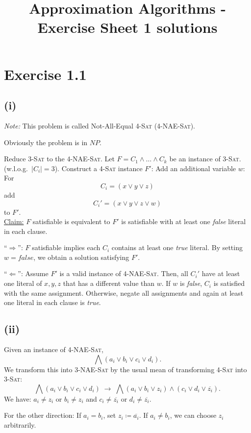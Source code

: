 \documentclass[oneside,a4paper]{amsart}
\newcommand{\NP}{\ensuremath{N \! P}}
\begin{document}
\title{Approximation Algorithms - Exercise Sheet 1 solutions}
\maketitle{}
\section*{Exercise 1.1}
\subsection*{(i)}
\textit{Note:} This problem is called Not-All-Equal \textsc{4-Sat} (\textsc{4-NAE-Sat}).

Obviously the problem is in \NP.

Reduce \textsc{3-Sat} to the \textsc{4-NAE-Sat}.
Let $F = C_1 \wedge \ldots \wedge C_k$ be an instance of \textsc{3-Sat}.
(w.l.o.g.~$|C_i| = 3$).
Construct a \textsc{4-Sat} instance $F'$: Add an additional variable $w$: For
\[
	C_i = (x \vee y \vee z)
\]
add
\[
	C_i' = (x \vee y \vee z \vee w)
\]
to $F'$. \\
\underline{Claim:} $F$ satisfiable is equivalent to $F'$ is satisfiable with at least one \textit{false} literal in each clause.

``$\Rightarrow$'': $F$ satisfiable implies each $C_i$ contains at least one \textit{true} literal. By setting $w = \textit{false}$, we obtain a solution satisfying $F'$.

``$\Leftarrow$'': Assume $F'$ is a valid instance of \textsc{4-NAE-Sat}. Then, all $C_i'$ have at least one literal of $x, y, z$ that has a different value than $w$.
If $w$ is \textit{false}, $C_i$ is satisfied with the same assignment. Otherwise, negate all assignments and again at least one literal in each clause is \textit{true}.
\subsection*{(ii)}
Given an instance of \textsc{4-NAE-Sat},
\[
	\bigwedge (a_i \vee b_i \vee c_i \vee d_i).
\]
We transform this into \textsc{3-NAE-Sat} by the usual mean of transforming \textsc{4-Sat} into \textsc{3-Sat}:
\[
	\bigwedge (a_i \vee b_i \vee c_i \vee d_i) \; \to \; \bigwedge (a_i \vee b_i \vee z_i) \wedge (c_i \vee d_i \vee \overline{z_i}).
\]
We have: $a_i \neq z_i$ or $b_i \neq z_i$ and $c_i \neq \overline{z_i}$ or $d_i \neq \overline{z_i}$.

For the other direction: If $a_i = b_i$, set $z_i \coloneqq \overline{a_i}$. If $a_i \neq b_i$, we can choose $z_i$ arbitrarily.
\end{document}

